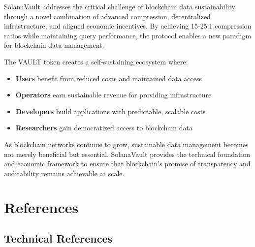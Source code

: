 \documentclass[12pt,a4paper]{article}
\begin{document}
SolanaVault addresses the critical challenge of blockchain data sustainability through a novel combination of advanced compression, decentralized infrastructure, and aligned economic incentives. By achieving 15-25:1 compression ratios while maintaining query performance, the protocol enables a new paradigm for blockchain data management.

The VAULT token creates a self-sustaining ecosystem where:

\begin{itemize}
    \item \textbf{Users} benefit from reduced costs and maintained data access
    \item \textbf{Operators} earn sustainable revenue for providing infrastructure
    \item \textbf{Developers} build applications with predictable, scalable costs
    \item \textbf{Researchers} gain democratized access to blockchain data
\end{itemize}

As blockchain networks continue to grow, sustainable data management becomes not merely beneficial but essential. SolanaVault provides the technical foundation and economic framework to ensure that blockchain's promise of transparency and auditability remains achievable at scale.

\section*{References}

\subsection*{Technical References}
\end{document}
